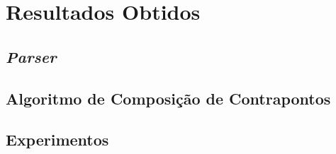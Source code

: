 \chapter[Resultados Obtidos]{Resultados Obtidos}

  \section[\textit{Parser}]{\textit{Parser}}
  \section[Algoritmo de Composição de Contrapontos]{Algoritmo de Composição de Contrapontos}
  \section[Experimentos]{Experimentos}

